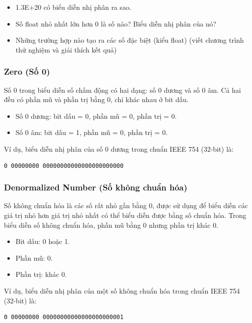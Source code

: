 \begin{itemize}
	\item 1.3E+20 có biểu diễn nhị phân ra sao.
	\item Số float nhỏ nhất lớn hơn 0 là số nào? Biểu diễn nhị phân của nó?
	\item Những trường hợp nào tạo ra các số đặc biệt (kiểu float) (viết chương trình thử nghiệm và giải thích kết quả)
\end{itemize}

\subsubsection{Zero (Số 0)}

Số 0 trong biểu diễn số chấm động có hai dạng: số 0 dương và số 0 âm. Cả hai đều có phần mũ và phần trị bằng 0, chỉ khác nhau ở bit dấu.

\begin{itemize}
    \item Số 0 dương: bit dấu = 0, phần mũ = 0, phần trị = 0.
    \item Số 0 âm: bit dấu = 1, phần mũ = 0, phần trị = 0.
\end{itemize}

Ví dụ, biểu diễn nhị phân của số 0 dương trong chuẩn IEEE 754 (32-bit) là:
\begin{verbatim}
0 00000000 00000000000000000000000
\end{verbatim}

\subsubsection{Denormalized Number (Số không chuẩn hóa)}

Số không chuẩn hóa là các số rất nhỏ gần bằng 0, được sử dụng để biểu diễn các giá trị nhỏ hơn giá trị nhỏ nhất có thể biểu diễn được bằng số chuẩn hóa. Trong biểu diễn số không chuẩn hóa, phần mũ bằng 0 nhưng phần trị khác 0.

\begin{itemize}
    \item Bit dấu: 0 hoặc 1.
    \item Phần mũ: 0.
    \item Phần trị: khác 0.
\end{itemize}

Ví dụ, biểu diễn nhị phân của một số không chuẩn hóa trong chuẩn IEEE 754 (32-bit) là:
\begin{verbatim}
0 00000000 00000000000000000000001
\end{verbatim}

